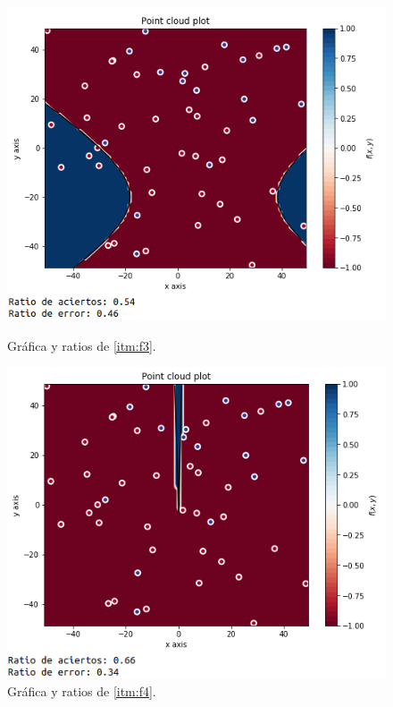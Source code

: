 \documentclass[11pt,a4paper]{article}
\begin{document}
\begin{figure}[H]
\centering
\begin{minipage}{.5\textwidth}
	\centering
	\includegraphics[scale=0.35]{img/f3.png}
	\caption{Gráfica y ratios de \ref{itm:f3}.}
\end{minipage}%
\begin{minipage}{.5\textwidth}
	\centering
	\includegraphics[scale=0.35]{img/f4.png}
	\caption{Gráfica y ratios de \ref{itm:f4}.}
\end{minipage}
\end{figure}
\end{document}
